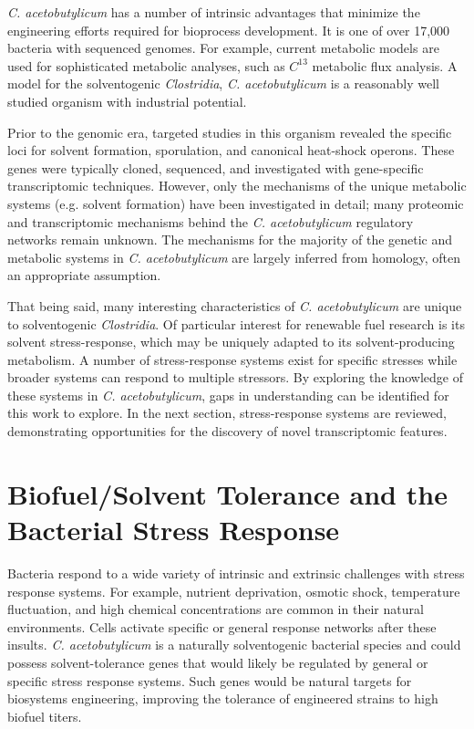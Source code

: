 \textit{C. acetobutylicum} has a number of intrinsic advantages that minimize the engineering efforts required for bioprocess development. It is one of over 17,000 bacteria with sequenced genomes.\cite{89,90,91} For example, current metabolic models\cite{100} are used for sophisticated metabolic analyses, such as $C^{13}$ metabolic flux analysis.\cite{99} A model for the solventogenic \textit{Clostridia}, \textit{C. acetobutylicum} is a reasonably well studied organism with industrial potential.

Prior to the genomic era, targeted studies in this organism revealed the specific loci for solvent formation,\cite{62,63,64,66,68,72,73} sporulation,\cite{125} and canonical heat-shock operons.\cite{76,80} These genes were typically cloned, sequenced, and investigated with gene-specific transcriptomic techniques. However, only the mechanisms of the unique metabolic systems (e.g. solvent formation) have been investigated in detail; many proteomic and transcriptomic mechanisms behind the \textit{C. acetobutylicum} regulatory networks remain unknown.\cite{126,42} The mechanisms for the majority of the genetic and metabolic systems in \textit{C. acetobutylicum} are largely inferred from homology, often an appropriate assumption.

That being said, many interesting characteristics of \textit{C. acetobutylicum} are unique to solventogenic \textit{Clostridia}. Of particular interest for renewable fuel research is its solvent stress-response, which may be uniquely adapted to its solvent-producing metabolism. A number of stress-response systems exist for specific stresses while broader systems can respond to multiple stressors. By exploring the knowledge of these systems in \textit{C. acetobutylicum}, gaps in understanding can be identified for this work to explore. In the next section, stress-response systems are reviewed, demonstrating opportunities for the discovery of novel transcriptomic features.

\section{Biofuel/Solvent Tolerance and the Bacterial Stress Response}


Bacteria respond to a wide variety of intrinsic and extrinsic challenges with stress response systems.\cite{11,24,77} For example, nutrient deprivation, osmotic shock, temperature fluctuation, and high chemical concentrations are common in their natural environments.\cite{11} Cells activate specific or general response networks after these insults. \textit{C. acetobutylicum} is a naturally solventogenic bacterial species and could possess solvent-tolerance genes that would likely be regulated by general or specific stress response systems. Such genes would be natural targets for biosystems engineering, improving the tolerance of engineered strains to high biofuel titers. 

